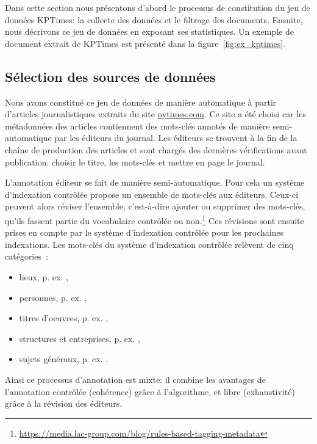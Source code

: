 Dans cette section nous présentons d'abord le processus de constitution du jeu de données KPTimes: la collecte des données et le filtrage des documents.
Ensuite, nous décrivons ce jeu de données en exposant ses statistiques. Un exemple de document extrait de KPTimes est présenté dans la figure~\ref{fig:ex_kptimes}.



\subsection{Sélection des sources de données}

Nous avons constitué ce jeu de données de manière automatique à partir d'articles journalistiques extraits du site \url{nytimes.com}.
Ce site a été choisi car les métadonnées des articles contiennent des mots-clés annotés de manière semi-automatique par les éditeurs du journal.
Les éditeurs se trouvent à la fin de la chaîne de production des articles et sont chargés des dernières vérifications avant publication: choisir le titre, les mots-clés et mettre en page le journal.

L'annotation éditeur se fait de manière semi-automatique. Pour cela un système d'indexation contrôlée propose un ensemble de mots-clés aux éditeurs.
Ceux-ci peuvent alors réviser l'ensemble, c'est-à-dire ajouter ou supprimer des mots-clés, qu'ils fassent partie du vocabulaire contrôlée ou non.\footnote{\url{https://media.lac-group.com/blog/rules-based-tagging-metadata}}
Ces révisions sont ensuite prises en compte par le système d'indexation contrôlée pour les prochaines indexations.
Les mots-clés du système d'indexation contrôlée relèvent de cinq catégories~\cite{sandhaus_new_2008}:
\begin{itemize}
    \item lieux, p. ex. ,
    \item personnes, p. ex. ,
    \item titres d'oeuvres, p. ex. ,
    \item structures et entreprises, p. ex. ,
    \item sujets généraux, p. ex. .
\end{itemize}
Ainsi ce processus d'annotation est mixte: il combine les avantages de l'annotation contrôlée (cohérence) grâce à l'algorithme, et libre (exhaustivité) grâce à la révision des éditeurs.

